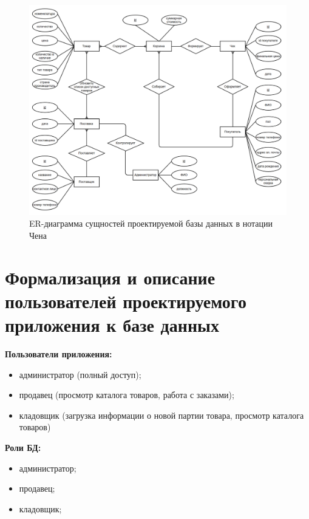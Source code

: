 \begin{figure}
	\centering
	\includegraphics[width=1\linewidth]{"pictures/ER Chen"}
	\caption{ER-диаграмма сущностей проектируемой базы данных в нотации Чена}
	\label{fig:ER}
\end{figure}


\section{Формализация и описание пользователей проектируемого приложения к базе данных}

\textbf{Пользователи приложения:}
\begin{itemize}
	\item администратор (полный доступ);
	\item продавец (просмотр каталога товаров, работа с заказами);
	\item кладовщик (загрузка информации о новой партии товара, просмотр каталога товаров)
	\end{itemize}

\textbf{Роли БД:}
\begin{itemize}
	\item администратор;
	\item продавец;
	\item кладовщик;
\end{itemize}

